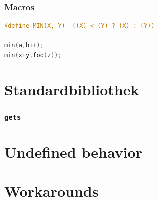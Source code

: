 \documentclass[12pt,compress]{beamer}
\begin{document}
\begin{frame}[fragile]
\frametitle{Macros}

\begin{lstlisting}[language=C,basicstyle=\ttfamily,keywordstyle=\color{red}]
#define MIN(X, Y)  ((X) < (Y) ? (X) : (Y))

min(a,b++);
min(x+y,foo(z));
\end{lstlisting}
\end{frame}

\section{Standardbibliothek}
\begin{frame}[fragile]
    \frametitle{\texttt{gets}}

%
%
%
    

\end{frame}




\section{Undefined behavior}

\section{Workarounds}






\end{document}
